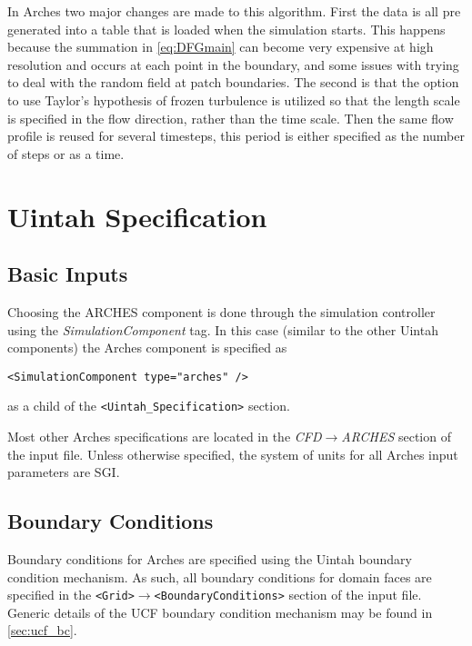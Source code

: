 In Arches two major changes are made to this algorithm. First the data is all pre generated into a table that is loaded when the simulation starts. This happens because the summation in \ref{eq:DFGmain} can become very expensive at high resolution and occurs at each point in the boundary, and some issues with trying to deal with the random field at patch boundaries. The second is that the option to use Taylor's hypothesis of frozen turbulence is utilized so that the length scale is specified in the flow direction, rather than the time scale. Then the same flow profile is reused for several timesteps, this period is either specified as the number of steps or as a time.


\section{Uintah Specification}
%
\subsection{Basic Inputs}
%
Choosing the ARCHES component is done through the simulation controller using the {\it SimulationComponent} tag.  In this case (similar to the other Uintah components) the Arches component is specified as
%
\begin{Verbatim}[fontsize=\footnotesize]
<SimulationComponent type="arches" />
\end{Verbatim}
%
as a child of the \verb=<Uintah_Specification>= section.  

Most other Arches specifications are located in the {\it CFD$\rightarrow$ARCHES} section of the input file.  Unless otherwise specified, the system of units for all Arches input parameters are SGI.

\subsection{Boundary Conditions}\label{sec:boundaryconditions}
Boundary conditions for Arches are specified using the Uintah boundary condition mechanism.  As such, all boundary conditions for domain faces are specified in the \verb=<Grid>=$\rightarrow$\verb=<BoundaryConditions>= section of the input file.  Generic details of the UCF boundary condition mechanism may be found in \ref{sec:ucf_bc}.  

